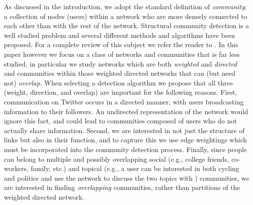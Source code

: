 As discussed in the introduction, we adopt the standard definition of \emph{community}: a collection of nodes (users) within a network who are more densely connected to each other than with the rest of the network. Structural community detection is a well studied problem and several different methods and algorithms have been proposed. For a complete review of this subject we refer the reader to \cite{porter2009communities, fortunato2010community}. In this paper however we focus on a class of networks and communities that is far less studied, in particular we study networks which are both \textit{weighted} and \textit{directed} and communities within those weighted directed networks that can (but need not) \emph{overlap}. When selecting a detection algorithm we propose that all three (weight, direction, and overlap) are important for the following reasons. First, communication on Twitter occurs in a directed manner, with users broadcasting information to their followers. An undirected representation of the network would ignore this fact, and could lead to communities composed of users who do not actually share information. Second, we are interested in not just the structure of links but also in their function, and to capture this we use edge weightings which must be incorporated into the community detection process. Finally, since people can belong to multiple and possibly overlapping social (e.g., college friends, co-workers, family, etc.) and topical (e.g., a user can be interested in both cycling and politics and use the network to discuss the two topics with \DIFdelbegin {}\DIFdelend \DIFaddbegin {}\DIFaddend ) communities, we are interested in finding \textit{overlapping} communities, rather than partitions of the weighted directed network. 

